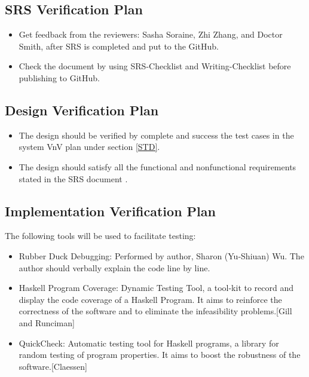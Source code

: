 \documentclass[12pt, titlepage]{article}
\begin{document}
\subsection{SRS Verification Plan}

\begin{itemize}

\item Get feedback from the reviewers: Sasha Soraine, Zhi Zhang, and Doctor
Smith, after SRS is completed and put to the GitHub.
\item Check the document by using SRS-Checklist and Writing-Checklist before
publishing to GitHub.

\end{itemize}


\subsection{Design Verification Plan}
\begin{itemize}

\item The design should be verified by complete and success the test cases in
the system VnV plan under section \ref{STD}.
\item The design should satisfy all the functional and nonfunctional requirements stated in the SRS document \cite{YS2019}.


\end{itemize}


\label{Planfordv}

\subsection{Implementation Verification Plan} 
The following tools will be used to facilitate testing: 

\begin{itemize}
\item[ ]Rubber Duck Debugging: Performed by author, Sharon (Yu-Shiuan) Wu. The 
author should verbally explain the code line by line.
\item[ ]Haskell Program Coverage: Dynamic Testing Tool, a tool-kit to record 
and display the code coverage of a Haskell Program. It aims to reinforce the 
correctness of the software and to eliminate the infeasibility problems.[Gill
and Runciman] \cite{GillandRunciman}
\item[ ]QuickCheck: Automatic testing tool for Haskell programs, a library for
random testing of program properties. It aims to boost the robustness of the 
software.[Claessen] \cite{QuickCheck}
		
\end{itemize} 
\end{document}

